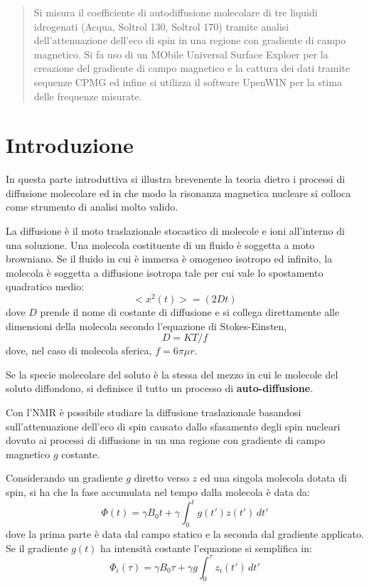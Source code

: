 \begin{abstract}
Si misura il coefficiente di autodiffusione molecolare di tre liquidi idrogenati (Acqua, Soltrol 130, Soltrol 170) tramite analisi dell'attenuazione dell'eco di spin in una regione con gradiente di campo magnetico. Si fa uso di un MObile Universal Surface Exploer per la creazione del gradiente di campo magnetico e la cattura dei dati tramite sequenze CPMG ed infine si utilizza il software UpenWIN per la stima delle frequenze misurate.
\end{abstract}

\section*{Introduzione}

In questa parte introduttiva si illustra brevenente la teoria dietro i processi di diffusione molecolare ed in che modo la risonanza magnetica nucleare si colloca come strumento di analisi molto valido.

La diffusione è il moto traslazionale stocastico di molecole e ioni all'interno di una soluzione. Una molecola costituente di un fluido è soggetta a moto browniano. Se il fluido in cui è immersa è omogeneo isotropo ed infinito, la molecola è soggetta a diffusione isotropa tale per cui vale lo spostamento quadratico medio:
\begin{equation}
	<x^2(t)> = (2Dt)
\end{equation}
dove $D$ prende il nome di costante di diffusione e si collega direttamente alle dimensioni della molecola secondo l'equazione di Stokes-Einsten,
\begin{equation}
	D = KT/f
\end{equation}
dove, nel caso di molecola sferica, $f = 6\pi\mu r$.

Se la specie molecolare del soluto è la stessa del mezzo in cui le molecole del soluto diffondono, si definisce il tutto un processo di \textbf{auto-diffusione}.

Con l'NMR è possibile studiare la diffusione traslazionale basandosi sull'attenuazione dell'eco di spin causato dallo sfasamento degli spin nucleari dovuto ai processi di diffusione in un una regione con gradiente di campo magnetico $g$ costante.

Considerando un gradiente $g$ diretto verso $z$ ed una singola molecola dotata di spin, si ha che la fase accumulata nel tempo dalla molecola è data da:
\begin{equation}
	\Phi(t) = \gamma B_0 t + \gamma \int_0^t g(t')z(t')\,dt'
\end{equation}
dove la prima parte è data dal campo statico e la seconda dal gradiente applicato. Se il gradiente $g(t)$ ha intensità costante l'equazione si semplifica in:
\begin{equation}
	\Phi_i(\tau) = \gamma B_0 \tau + \gamma g \int_{0}^{\tau}z_i(t')\,dt'
\end{equation}

